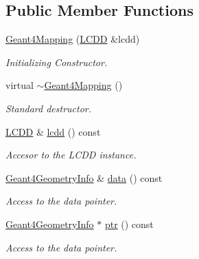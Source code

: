 \subsection*{Public Member Functions}
\begin{DoxyCompactItemize}
\item 
\hyperlink{class_d_d4hep_1_1_simulation_1_1_geant4_mapping_a60aefec5f9d5816368c7e3db4065b546}{Geant4Mapping} (\hyperlink{class_d_d4hep_1_1_geometry_1_1_l_c_d_d}{LCDD} \&lcdd)
\begin{DoxyCompactList}\small\item\em Initializing Constructor. \item\end{DoxyCompactList}\item 
virtual \hyperlink{class_d_d4hep_1_1_simulation_1_1_geant4_mapping_a497e1e6164765a418d66430d4d404708}{$\sim$Geant4Mapping} ()
\begin{DoxyCompactList}\small\item\em Standard destructor. \item\end{DoxyCompactList}\item 
\hyperlink{class_d_d4hep_1_1_geometry_1_1_l_c_d_d}{LCDD} \& \hyperlink{class_d_d4hep_1_1_simulation_1_1_geant4_mapping_a7c49db7ba62f718a331ea440f8087cf8}{lcdd} () const 
\begin{DoxyCompactList}\small\item\em Accesor to the LCDD instance. \item\end{DoxyCompactList}\item 
\hyperlink{class_d_d4hep_1_1_simulation_1_1_geant4_geometry_info}{Geant4GeometryInfo} \& \hyperlink{class_d_d4hep_1_1_simulation_1_1_geant4_mapping_ae4f8df1c20c159dc7e467119d16e964c}{data} () const 
\begin{DoxyCompactList}\small\item\em Access to the data pointer. \item\end{DoxyCompactList}\item 
\hyperlink{class_d_d4hep_1_1_simulation_1_1_geant4_geometry_info}{Geant4GeometryInfo} $\ast$ \hyperlink{class_d_d4hep_1_1_simulation_1_1_geant4_mapping_a2bb27aff241a897321e96001b85783da}{ptr} () const 
\begin{DoxyCompactList}\small\item\em Access to the data pointer. \item\end{DoxyCompactList}\item 

\end{DoxyCompactItemize}

